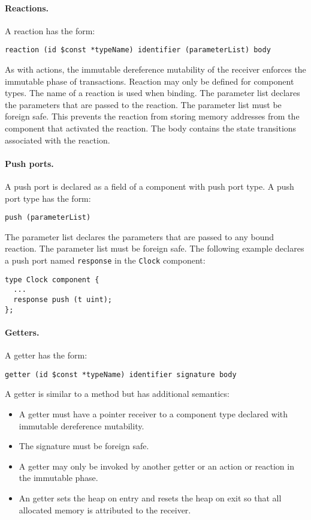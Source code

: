 \paragraph{Reactions.}
A reaction has the form:
\begin{verbatim}
reaction (id $const *typeName) identifier (parameterList) body
\end{verbatim}
As with actions, the immutable dereference mutability of the receiver enforces the immutable phase of transactions.
Reaction may only be defined for component types.
The name of a reaction is used when binding.
The parameter list declares the parameters that are passed to the reaction.
The parameter list must be foreign safe.
This prevents the reaction from storing memory addresses from the component that activated the reaction.
The body contains the state transitions associated with the reaction.

\paragraph{Push ports.}
A push port is declared as a field of a component with push port type.
A push port type has the form:
\begin{verbatim}
push (parameterList)
\end{verbatim}
The parameter list declares the parameters that are passed to any bound reaction.
The parameter list must be foreign safe.
The following example declares a push port named \verb+response+ in the \verb+Clock+ component:
\begin{verbatim}
type Clock component {
  ...
  response push (t uint);
};
\end{verbatim}

\paragraph{Getters.}
A getter has the form:
\begin{verbatim}
getter (id $const *typeName) identifier signature body
\end{verbatim}
A getter is similar to a method but has additional semantics:
\begin{itemize}
\item A getter must have a pointer receiver to a component type declared with immutable dereference mutability.
\item The signature must be foreign safe.
\item A getter may only be invoked by another getter or an action or reaction in the immutable phase.
\item An getter sets the heap on entry and resets the heap on exit so that all allocated memory is attributed to the receiver.
\end{itemize}

